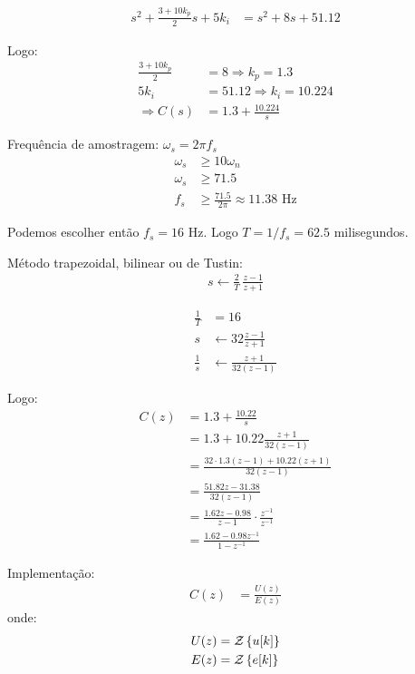 \documentclass[12pt, a4paper]{article}
\begin{document}
\begin{align}
s^2+\frac{3+10k_p}{2}s+5k_i &= s^2+8s+51.12
\end{align}

Logo:
\begin{align}
	\frac{3+10k_p}{2} &= 8 \Rightarrow k_p = 1.3\\
	5k_i &= 51.12 \Rightarrow k_i = 10.224\\
	\Rightarrow C(s) &= 1.3 + \frac{10.224}{s}
\end{align}

Frequência de amostragem: $\omega_s = 2\pi f_s$
\begin{align}
	\omega_s &\geq 10\omega_n\\
	\omega_s &\geq 71.5\\
	f_s &\geq \frac{71.5}{2\pi} \approx 11.38 \text{ Hz}
\end{align}

Podemos escolher então $f_s=16$ Hz. Logo $T=1/f_s=62.5$ milisegundos. 

\pagebreak
Método trapezoidal, bilinear ou de Tustin:
\begin{align}
	s \leftarrow \frac{2}{T}\,\frac{z-1}{z+1}
\end{align}

\begin{align}
	\frac{1}{T} &= 16\\
	s &\leftarrow 32 \frac{z-1}{z+1} \\
	\frac{1}{s}&\leftarrow \frac{z+1}{32(z-1)}
\end{align}

Logo:
\begin{align}
	C(z) &= 1.3 + \frac{10.22}{s}\\
	&= 1.3 + 10.22 \frac{z+1}{32(z-1)}\\
	&= \frac{32\cdot 1.3(z-1)+10.22(z+1)}{32(z-1)}\\
	&= \frac{51.82z-31.38}{32(z-1)}\\
	&= \frac{1.62z-0.98}{z-1} \cdot \frac{z^{-1}}{z^{-1}}\\
	&= \frac{1.62-0.98z^{-1}}{1-z^{-1}}
\end{align}

\pagebreak
Implementação:
\begin{align}
	C(z) &= \frac{U(z)}{E(z)}
\end{align}
onde:
\begin{align}
	U(z) &= \mathcal{Z}\left\{u[k]\right\}\\
	E(z) &= \mathcal{Z}\left\{e[k]\right\}
\end{align}
\end{document}
